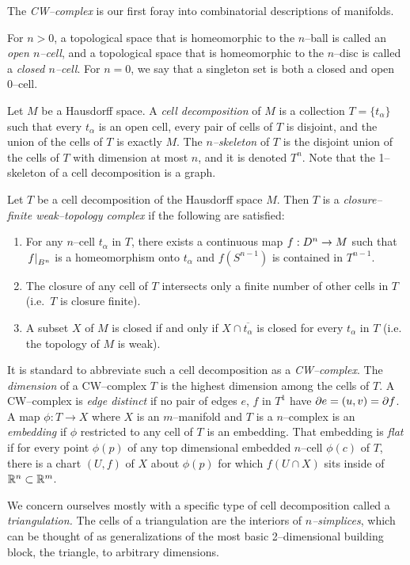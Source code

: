 The \emph{CW--complex} is our first foray into combinatorial descriptions of manifolds.

\begin{defn}
	For $n>0$, a topological space that is homeomorphic to the $n$--ball is called an \emph{open $n$--cell}, and a topological space that is homeomorphic to the $n$--disc is called a \emph{closed $n$--cell}.
	For $n=0$, we say that a singleton set is both a closed and open 0--cell.
	
	Let $M$ be a Hausdorff space.
	A \emph{cell decomposition} of $M$ is a collection $T=\{t_\alpha\}$ such that every $t_\alpha$ is an open cell, every pair of cells of $T$ is disjoint, and the union of the cells of $T$ is exactly $M$.
	The \emph{$n$--skeleton} of $T$ is the disjoint union of the cells of $T$ with dimension at most $n$, and it is denoted $T^n$.
	Note that the 1--skeleton of a cell decomposition is a graph.
	
	Let $T$ be a cell decomposition of the Hausdorff space $M$.
	Then $T$ is a \emph{closure--finite weak--topology complex} if the following are satisfied: 
	\begin{enumerate}
		\item For any $n$--cell $t_\alpha$ in $T$, there exists a continuous map $f:D^n\to M$ such that $\left.f\right|_{B^n}$ is a homeomorphism onto $t_\alpha$ and $f(S^{n-1})$ is contained in $T^{n-1}$.
		\item The closure of any cell of $T$ intersects only a finite number of other cells in $T$ (i.e.\ $T$ is closure finite).
		\item A subset $X$ of $M$ is closed if and only if $X\cap \overline{t_\alpha}$ is closed for every $t_\alpha$ in $T$ (i.e. the topology of $M$ is weak).		
	\end{enumerate}
	It is standard to abbreviate such a cell decomposition as a \emph{CW--complex}.	
	The \emph{dimension} of a CW--complex $T$ is the highest dimension among the cells of $T$.
	A CW--complex is \emph{edge distinct} if no pair of edges $e$, $f$ in $T^1$ have $\partial e=(u,v)=\partial f$.
	A map $\phi:T\to X$ where $X$ is an $m$--manifold and $T$ is a $n$--complex is an \emph{embedding} if $\phi$ restricted to any cell of $T$ is an embedding.
	That embedding is \emph{flat} if for every point $\phi(p)$ of any top dimensional embedded $n$--cell $\phi(c)$ of $T$, there is a chart $(U,f)$ of $X$ about $\phi(p)$ for which $f(U\cap X)$ sits inside of $\mathbb{R}^n\subset \mathbb{R}^m$.
\end{defn}

We concern ourselves mostly with a specific type of cell decomposition called a \emph{triangulation.}
The cells of a triangulation are the interiors of \emph{$n$--simplices}, which can be thought of as generalizations of the most basic 2--dimensional building block, the triangle, to arbitrary dimensions.

